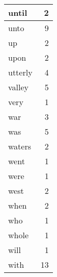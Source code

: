 \begin{center}
\begin{longtable}{l|r}
until & 2 \\ \hline
unto & 9 \\ \hline
up & 2 \\ \hline
upon & 2 \\ \hline
utterly & 4 \\ \hline
valley & 5 \\ \hline
very & 1 \\ \hline
war & 3 \\ \hline
was & 5 \\ \hline
waters & 2 \\ \hline
went & 1 \\ \hline
were & 1 \\ \hline
west & 2 \\ \hline
when & 2 \\ \hline
who & 1 \\ \hline
whole & 1 \\ \hline
will & 1 \\ \hline
with & 13 \\ \hline
\end{longtable}
\end{center}



\normalsize



